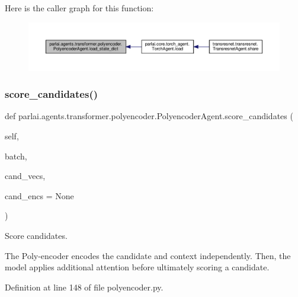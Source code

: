 Here is the caller graph for this function\+:
\nopagebreak
\begin{figure}[H]
\begin{center}
\leavevmode
\includegraphics[width=350pt]{classparlai_1_1agents_1_1transformer_1_1polyencoder_1_1PolyencoderAgent_a4b6301664c0a7e98e9c688cc75ca79dc_icgraph}
\end{center}
\end{figure}
\mbox{\label{classparlai_1_1agents_1_1transformer_1_1polyencoder_1_1PolyencoderAgent_ad75794f4004267ab538258bc2571235f}} 
\subsubsection{\texorpdfstring{score\+\_\+candidates()}{score\_candidates()}}
{\footnotesize\ttfamily def parlai.\+agents.\+transformer.\+polyencoder.\+Polyencoder\+Agent.\+score\+\_\+candidates (\begin{DoxyParamCaption}\item[{}]{self,  }\item[{}]{batch,  }\item[{}]{cand\+\_\+vecs,  }\item[{}]{cand\+\_\+encs = {\ttfamily None} }\end{DoxyParamCaption})}

\begin{DoxyVerb}Score candidates.

The Poly-encoder encodes the candidate and context independently. Then,
the model applies additional attention before ultimately scoring a
candidate.
\end{DoxyVerb}
 

Definition at line 148 of file polyencoder.\+py.



